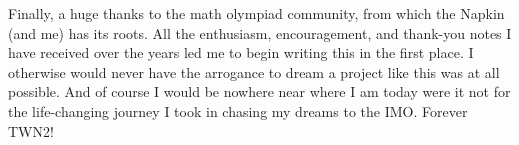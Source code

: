 Finally, a huge thanks to the math olympiad community,
from which the Napkin (and me) has its roots.
All the enthusiasm, encouragement, and thank-you notes I have received
over the years led me to begin writing this in the first place.
I otherwise would never have the arrogance to dream a project like this
was at all possible.
And of course I would be nowhere near where I am today were it not for the
life-changing journey I took in chasing my dreams to the IMO.
Forever TWN2!

